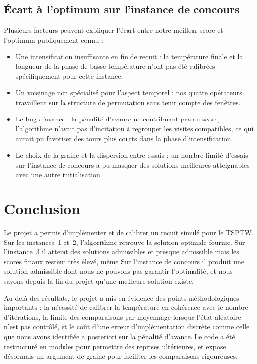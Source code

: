 \documentclass[11pt,a4paper]{article}
\begin{document}
\subsection{Écart à l'optimum sur l'instance de concours}

Plusieurs facteurs peuvent expliquer l'écart entre notre meilleur score et l'optimum
publiquement connu :
\begin{itemize}
  \item Une intensification insuffisante en fin de recuit : la température finale et
    la longueur de la phase de basse température n'ont pas été calibrées
    spécifiquement pour cette instance.
  \item Un voisinage non spécialisé pour l'aspect temporel : nos quatre opérateurs
    travaillent sur la structure de permutation sans tenir compte des fenêtres.
  \item Le bug d'avance : la pénalité d'avance ne contribuant pas au score,
    l'algorithme n'avait pas d'incitation à regrouper les visites compatibles, ce qui
    aurait pu favoriser des tours plus courts dans la phase d'intensification.
  \item Le choix de la graine et la dispersion entre essais : un nombre limité
    d'essais sur l'instance de concours a pu masquer des solutions meilleures
    atteignables avec une autre initialisation.
\end{itemize}

\section{Conclusion}

Le projet a permis d'implémenter et de calibrer un recuit simulé pour le \textsc{TSPTW}.
Sur les instances~1 et~2, l'algorithme retrouve la solution optimale fournie. Sur
l'instance~3 il atteint des solutions admissibles et presque admissible mais les scores finaux restent très élevé, même  Sur l'instance de concours il produit une solution admissible dont
nous ne pouvons pas garantir l'optimalité, et nous savons depuis la fin du projet
qu'une meilleure solution existe.

Au-delà des résultats, le projet a mis en évidence des points méthodologiques
importants : la nécessité de calibrer la température en cohérence avec le nombre
d'itérations, la limite des comparaisons par moyennage lorsque l'état aléatoire
n'est pas contrôlé, et le coût d'une erreur d'implémentation discrète comme celle que
nous avons identifiée a posteriori sur la pénalité d'avance. Le code a été restructuré
en modules pour permettre des reprises ultérieures, et expose désormais un argument
de graine pour faciliter les comparaisons rigoureuses.
\end{document}

